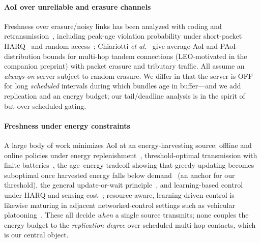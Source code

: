 \documentclass[twocolumn,3p,times,procedia]{elsarticle}
\begin{document}
\paragraph*{AoI over unreliable and erasure channels}
Freshness over erasure/noisy links has been analyzed with coding and
retransmission~\cite{parag2017,najm2019}, including peak-age violation
probability under short-packet HARQ~\cite{devassy2019} and random
access~\cite{chen2022}; Chiariotti \emph{et al.}~\cite{chiariotti} give
average-AoI and PAoI-distribution bounds for multi-hop tandem
connections (LEO-motivated in the companion preprint) with packet
erasure and tributary traffic. All assume an \emph{always-on} server subject to random
erasure. We differ in that the server is OFF for long \emph{scheduled}
intervals during which bundles age in buffer---and we add replication and
an energy budget; our tail/deadline analysis is in the spirit
of~\cite{devassy2019} but over scheduled gating.

\paragraph*{Freshness under energy constraints}
A large body of work minimizes AoI at an energy-harvesting source: offline
and online policies under energy replenishment~\cite{bacinoglu2015,wu2018},
threshold-optimal transmission with finite batteries~\cite{arafa2020}, the
age--energy tradeoff showing that greedy updating becomes suboptimal once
harvested energy falls below demand~\cite{bacinoglu2018} (an anchor for our
threshold), the general update-or-wait principle~\cite{sun2017}, and
learning-based control under HARQ and sensing cost~\cite{ceran2019};
resource-aware, learning-driven control is likewise maturing in adjacent
networked-control settings such as vehicular
platooning~\cite{wu2025ton}. These
all decide \emph{when} a single source transmits; none couples the energy
budget to the \emph{replication degree} over scheduled multi-hop contacts,
which is our central object.
\end{document}
